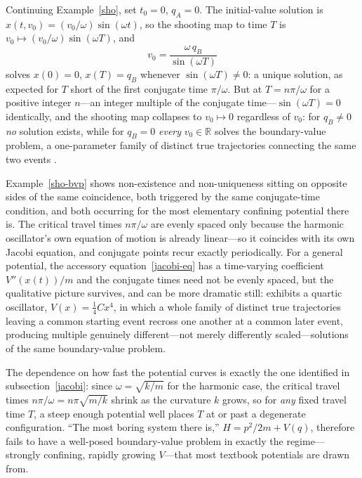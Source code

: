 \begin{example}
\label{sho-bvp}
Continuing Example~\ref{sho}, set $t_0=0$, $q_A=0$. The initial-value solution
    is $x(t,v_0)=(v_0/\omega)\sin(\omega t)$, so the shooting map to time $T$
    is $v_0\mapsto (v_0/\omega)\sin(\omega T)$, and
\begin{equation}
v_0 = \frac{\omega\, q_B}{\sin(\omega T)}
\end{equation}
solves $x(0)=0$, $x(T)=q_B$ whenever $\sin(\omega T)\neq0$: a unique solution,
    as expected for $T$ short of the first conjugate time $\pi/\omega$. But at
    $T=n\pi/\omega$ for a positive integer $n$---an integer multiple of the
    conjugate time---$\sin(\omega T)=0$ identically, and the shooting map
    collapses to $v_0\mapsto 0$ regardless of $v_0$: for $q_B\neq0$ \emph{no}
    solution exists, while for $q_B=0$ \emph{every} $v_0\in\mathbb{R}$ solves
    the boundary-value problem, a one-parameter family of distinct true
    trajectories connecting the same two events \cite{gray2009}.
\end{example}

Example~\ref{sho-bvp} shows non-existence and non-uniqueness sitting on
opposite sides of the same coincidence, both triggered by the same
conjugate-time condition, and both occurring for the most elementary confining
potential there is. The critical travel times $n\pi/\omega$ are evenly spaced
only because the harmonic oscillator's own equation of motion is already
linear---so it coincides with its own Jacobi equation, and conjugate points
recur exactly periodically. For a general potential, the accessory
equation~\eqref{jacobi-eq} has a time-varying coefficient $V''(x(t))/m$ and the
conjugate times need not be evenly spaced, but the qualitative picture
survives, and can be more dramatic still: \cite{gray2009} exhibits a quartic
oscillator, $V(x)=\tfrac14 Cx^4$, in which a whole family of distinct true
trajectories leaving a common starting event recross one another at a common
later event, producing multiple genuinely different---not merely differently
scaled---solutions of the same boundary-value problem.

The dependence on how fast the potential curves is exactly the one identified
in subsection~\ref{jacobi}: since $\omega=\sqrt{k/m}$ for the harmonic case,
the critical travel times $n\pi/\omega = n\pi\sqrt{m/k}$ shrink as the
curvature $k$ grows, so for \emph{any} fixed travel time $T$, a steep enough
potential well places $T$ at or past a degenerate configuration. ``The most
boring system there is,'' $H=p^2/2m+V(q)$, therefore fails to have a well-posed
boundary-value problem in exactly the regime---strongly confining, rapidly
growing $V$---that most textbook potentials are drawn from.


